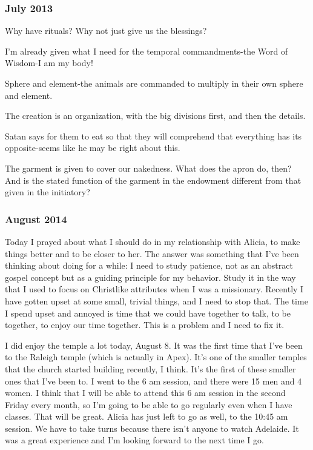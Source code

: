 		\subsubsection*{July 2013}

			Why have rituals? Why not just give us the blessings?

			I'm already given what I need for the temporal commandments-the Word of Wisdom-I am my body!

			Sphere and element-the animals are commanded to multiply in their own sphere and element.

			The creation is an organization, with the big divisions first, and then the details.

			Satan says for them to eat so that they will comprehend that everything has its opposite-seems like he may be right about this.

			The garment is given to cover our nakedness. What does the apron do, then? And is the stated function of the garment in the endowment different from that given in the initiatory?

		\subsubsection*{August 2014}

			Today I prayed about what I should do in my relationship with Alicia, to make things better and to be closer to her. The answer was something that I've been thinking about doing for a while: I need to study patience, not as an abstract gospel concept but as a guiding principle for my behavior. Study it in the way that I used to focus on Christlike attributes when I was a missionary. Recently I have gotten upset at some small, trivial things, and I need to stop that. The time I spend upset and annoyed is time that we could have together to talk, to be together, to enjoy our time together. This is a problem and I need to fix it.

			I did enjoy the temple a lot today, August 8. It was the first time that I've been to the Raleigh temple (which is actually in Apex). It's one of the smaller temples that the church started building recently, I think. It's the first of these smaller ones that I've been to. I went to the 6 am session, and there were 15 men and 4 women. I think that I will be able to attend this 6 am session in the second Friday every month, so I'm going to be able to go regularly even when I have classes. That will be great. Alicia has just left to go as well, to the 10:45 am session. We have to take turns because there isn't anyone to watch Adelaide. It was a great experience and I'm looking forward to the next time I go.

